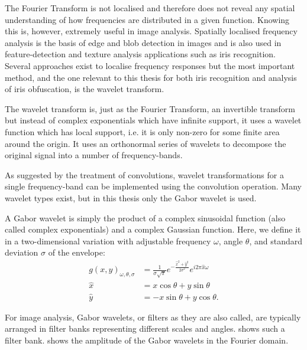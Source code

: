 The Fourier Transform is not localised and therefore does not reveal any spatial understanding of how frequencies are distributed in a given function. Knowing this is, however, extremely useful in image analysis. Spatially localised frequency analysis is the basis of edge and blob detection in images and is also used in feature-detection and texture analysis applications such as iris recognition. Several approaches exist to localise frequency responses but the most important method, and the one relevant to this thesis for both iris recognition and analysis of iris obfuscation, is the wavelet transform.

The wavelet transform is, just as the Fourier Transform, an invertible transform but instead of complex exponentials which have infinite support, it uses a wavelet function which has local support, i.e. it is only non-zero for some finite area around the origin. It uses an orthonormal series of wavelets to decompose the original signal into a number of frequency-bands.

As suggested by the treatment of convolutions, wavelet transformations for a single frequency-band can be implemented using the convolution operation. Many wavelet types exist, but in this thesis only the Gabor wavelet is used.



A Gabor wavelet is simply the product of a complex sinusoidal function (also called complex exponentials) and a complex Gaussian function. Here, we define it in a two-dimensional variation with adjustable frequency $\omega$, angle $\theta$, and standard deviation $\sigma$ of the envelope:
\begin{align}
    g(x,y)_{\omega, \theta, \sigma} &= \frac{1}{\sigma\sqrt{\pi}} e^{-\frac{\hat{x}^2+\hat{y}^2}{2\sigma^2}} e^{i 2\pi \hat{x}\omega}\\
    \hat{x} &= x\cos\theta + y\sin\theta \\
    \hat{y} &= -x\sin\theta + y\cos\theta.
\end{align}

For image analysis, Gabor wavelets, or filters as they are also called, are typically arranged in filter banks representing different scales and angles.  shows such a filter bank.  shows the amplitude of the Gabor wavelets in the Fourier domain.








